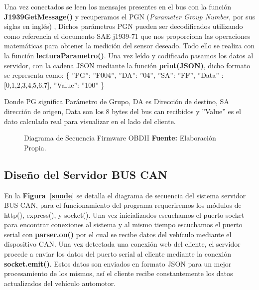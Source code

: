 Una vez conectados se leen los mensajes presentes en el bus con la función {\bfseries J1939GetMessage()} y recuperamos el PGN (\textit{Parameter Group Number}, por sus siglas en inglés) , 
Dichos parámetros PGN pueden ser decodificados utilizando como referencia el documento SAE j1939-71 que nos proporciona las operaciones matemáticas para obtener la medición del sensor deseado.  
Todo ello se realiza con la función {\bfseries lecturaParametro()}.
Una vez leído y codificado pasamos los datos al servidor, con la cadena JSON  mediante la función {\bfseries print(JSON)}, dicho formato se representa como: 
\{
''PG'': ''F004'',
''DA'':  ''04'',
''SA'':  ''FF'',
''Data'' : [0,1,2,3,4,5,6,7],
''Value'': ''100''
\}

Donde PG significa Parámetro de Grupo, DA es Dirección de destino, SA dirección de origen, Data son los 8 bytes del bus can recibidos y ''Value'' es el dato calculado real para visualizar en el lado del cliente.






\begin{figure}[t]
	\centering
	\begin{center}
		
	\end{center}
	\caption[Diagrama de Secuencia Firmware OBDII.]{Diagrama de Secuencia Firmware OBDII \textbf{ Fuente:} Elaboración Propia.}
	\label{sj} %
\end{figure}


\subsection{Diseño del Servidor BUS CAN}
En la \textbf{Figura~\ref{snode}} se detalla el diagrama de secuencia del sistema servidor BUS CAN, para el funcionamiento del programa requeriremos los módulos de http(), express(), y socket(). Una vez inicializados escuchamos el puerto socket para encontrar conexiones al sistema y al mismo tiempo escuchamos el puerto serial con {\bfseries parser.on()} por el cual se recibe datos del vehículo mediante el dispositivo CAN. 
Una vez detectada una conexión web del cliente,  el servidor  procede a enviar los datos del puerto serial al cliente mediante la conexión  {\bfseries socket.emit()}. Estos datos son enviados en formato JSON para un mejor procesamiento de los mismos,  así el cliente recibe constantemente los datos actualizados del vehículo automotor. 

